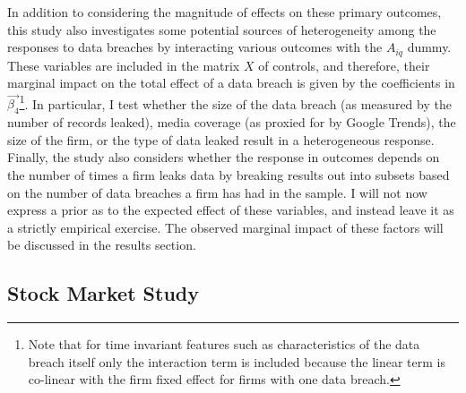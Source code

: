 \documentclass[../Main.tex]{subfiles}
\begin{document}
In addition to considering the magnitude of effects on these primary outcomes, this study also investigates some potential sources of heterogeneity among the responses to data breaches by interacting various outcomes with the $A_{iq}$ dummy. These variables are included in the matrix $X$ of controls, and therefore, their marginal impact on the total effect of a data breach is given by the coefficients in $\vec{\beta_4}$\footnote{Note that for time invariant features such as characteristics of the data breach itself only the interaction term is included because the linear term is co-linear with the firm fixed effect for firms with one data breach.}. In particular, I test whether the size of the data breach (as measured by the number of records leaked), media coverage (as proxied for by Google Trends), the size of the firm, or the type of data leaked result in a heterogeneous response. Finally, the study also considers whether the response in outcomes depends on the number of times a firm leaks data by breaking results out into subsets based on the number of data breaches a firm has had in the sample. I will not now express a prior as to the expected effect of these variables, and instead leave it as a strictly empirical exercise. The observed marginal impact of these factors will be discussed in the results section.

\subsection{Stock Market Study}
\end{document}
